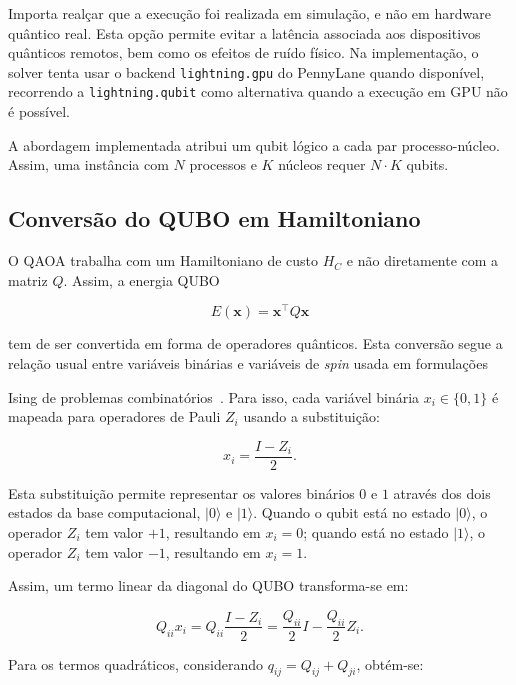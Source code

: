\documentclass[12pt,a4paper]{article}
\begin{document}
Importa realçar que a execução foi realizada em simulação, e não em hardware
quântico real. Esta opção permite evitar a latência associada aos dispositivos quânticos remotos, bem como os efeitos de ruído físico. Na implementação, o solver tenta
usar o backend \texttt{lightning.gpu} do PennyLane quando disponível, recorrendo a
\texttt{lightning.qubit} como alternativa quando a execução em GPU não é possível.

A abordagem implementada atribui um qubit lógico a cada par processo-núcleo. Assim,
uma instância com $N$ processos e $K$ núcleos requer $N \cdot K$ qubits.

\subsection{Conversão do QUBO em Hamiltoniano}
O QAOA trabalha com um Hamiltoniano de custo $H_C$ e não diretamente com a matriz $Q$. Assim, a energia QUBO

\begin{equation}
    E(\mathbf{x}) = \mathbf{x}^{\top}Q\mathbf{x}
\end{equation}

tem de ser convertida em forma de operadores quânticos. Esta conversão segue a
relação usual entre variáveis binárias e variáveis de \textit{spin} usada em formulações

Ising de problemas combinatórios~\cite{Lucas2014Ising}. Para isso, cada variável binária $x_i \in \{0,1\}$ é mapeada para operadores de Pauli $Z_i$ usando a substituição:

\begin{equation}
    x_i = \frac{I - Z_i}{2}.
\end{equation}

Esta substituição permite representar os valores binários $0$ e $1$ através dos
dois estados da base computacional, $\lvert 0\rangle$ e $\lvert 1\rangle$. Quando o qubit está no estado $\lvert 0\rangle$, o operador $Z_i$ tem valor
$+1$, resultando em $x_i = 0$; quando está no estado $\lvert 1\rangle$, o operador $Z_i$
tem valor $-1$, resultando em $x_i = 1$.

Assim, um termo linear da diagonal do QUBO transforma-se em:

\begin{equation}
    Q_{ii}x_i
    =
    Q_{ii}\frac{I - Z_i}{2}
    =
    \frac{Q_{ii}}{2}I - \frac{Q_{ii}}{2}Z_i.
\end{equation}

Para os termos quadráticos, considerando $q_{ij}=Q_{ij}+Q_{ji}$, obtém-se:
\end{document}
